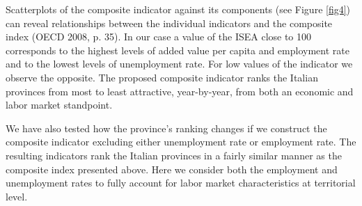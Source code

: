 Scatterplots of the composite indicator against its components (see Figure \ref{fig4}) can reveal relationships between the individual indicators and the composite index (OECD 2008, p. 35). In our case a value of the ISEA close to 100 corresponds to the highest levels of added value per capita and employment rate and to the lowest levels of unemployment rate. For low values of the indicator we observe the opposite. The proposed composite indicator ranks the Italian provinces from most to least attractive, year-by-year, from both an economic and labor market standpoint.

We have also tested how the province's ranking changes if we construct the composite indicator excluding either unemployment rate or employment rate. The resulting indicators rank the Italian provinces in a fairly similar manner as the composite index presented above. Here we consider both the employment and unemployment rates to fully account for labor market characteristics at territorial level.


